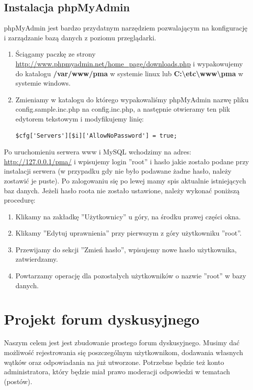 \documentclass[a4paper,10pt]{article}
\begin{document}
\subsection{Instalacja phpMyAdmin}
phpMyAdmin jest bardzo przydatnym narzędziem pozwalającym na konfigurację i zarządzanie bazą danych z poziomu przeglądarki. 
\begin{enumerate}
\item Ściągamy paczkę ze strony \href{http://www.phpmyadmin.net/home\_page/downloads.php}{http://www.phpmyadmin.net/home\_page/downloads.php} i wypakowujemy do katalogu \textbf{/var/www/pma} w systemie linux lub \textbf{C:\textbackslash etc\textbackslash www\textbackslash pma} w systemie windows.
\item Zmieniamy w katalogu do którego wypakowaliśmy phpMyAdmin nazwę pliku config.sample.inc.php na config.inc.php, a następnie otwieramy ten plik edytorem tekstowym i modyfikujemy linię:\\
\begin{verbatim}
$cfg['Servers'][$i]['AllowNoPassword'] = true;
\end{verbatim}
\end{enumerate}
Po uruchomieniu serwera www i MySQL wchodzimy na adres: \href{http://127.0.0.1/pma/}{http://127.0.0.1/pma/} i wpisujemy login ''root'' i hasło jakie zostało podane przy instalacji serwera (w przypadku gdy nie było podawane żadne hasło, należy zostawić je puste). Po zalogowaniu się po lewej mamy spis aktualnie istniejących baz danych. Jeżeli hasło roota nie zostało ustawione, należy wykonać poniższą procedurę: \\
\begin{enumerate}
\item Klikamy na zakładkę ''Użytkownicy'' u góry, na środku prawej części okna.
\item Klikamy ''Edytuj uprawnienia'' przy pierwszym z góry użytkowniku ''root''.
\item Przewijamy do sekcji ''Zmień hasło'', wpisujemy nowe hasło użytkownika, zatwierdzamy.
\item Powtarzamy operację dla pozostałych użytkowników o nazwie ''root'' w bazy danych.
\end{enumerate}
\section{Projekt forum dyskusyjnego}
Naszym celem jest jest zbudowanie prostego forum dyskusyjnego. Musimy dać możliwość rejestrowania się poszczególnym użytkownikom, dodawania własnych wątków oraz odpowiadania na już utworzone. Potrzebne będzie też konto administratora, który będzie miał prawo moderacji odpowiedzi w tematach (postów).
\end{document}

